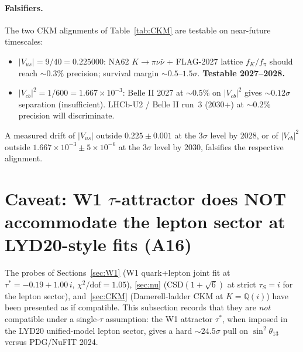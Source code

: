\documentclass[a4paper,11pt]{article}
\newcommand{\Qi}{\mathbb{Q}(i)}
\theoremstyle{definition}
\theoremstyle{remark}
\begin{document}
\paragraph{Falsifiers.}
The two CKM alignments of Table~\ref{tab:CKM} are testable on
near-future timescales:
\begin{itemize}
\item $|V_{us}|=9/40=0.225000$: NA62 $K\to\pi\nu\bar\nu$ + FLAG-2027
  lattice $f_K/f_\pi$ should reach $\sim 0.3\%$ precision; survival
  margin $\sim 0.5$--$1.5\sigma$.  \textbf{Testable 2027--2028.}
\item $|V_{cb}|^2=1/600=1.667\times 10^{-3}$: Belle II 2027 at
  $\sim 0.5\%$ on $|V_{cb}|^2$ gives $\sim 0.12\sigma$ separation
  (insufficient).  LHCb-U2 / Belle II run~3 (2030+) at $\sim 0.2\%$
  precision will discriminate.
\end{itemize}
A measured drift of $|V_{us}|$ outside $0.225\pm 0.001$ at the
$3\sigma$ level by 2028, or of $|V_{cb}|^2$ outside $1.667\times 10^{-3}
\pm 5\times 10^{-6}$ at the $3\sigma$ level by 2030, falsifies the
respective alignment.

\section{Caveat: W1 $\tau$-attractor does NOT accommodate
         the lepton sector at LYD20-style fits (A16)}
\label{sec:caveat}

The probes of Sections~\ref{sec:W1} (W1 quark+lepton joint fit at
$\tau^{*}=-0.19+1.00\,i$, $\chi^2/\mathrm{dof}=1.05$),
\ref{sec:nu} (CSD$(1+\sqrt 6)$ at strict $\tau_S=i$ for the lepton
sector), and~\ref{sec:CKM} (Damerell-ladder CKM at $K=\Qi$) have
been presented as if compatible.  This subsection records that they
are \emph{not} compatible under a single-$\tau$ assumption: the W1
attractor $\tau^{*}$, when imposed in the LYD20 unified-model lepton
sector, gives a hard $\sim 24.5\sigma$ pull on $\sin^2\theta_{13}$
versus PDG/NuFIT 2024.
\end{document}
